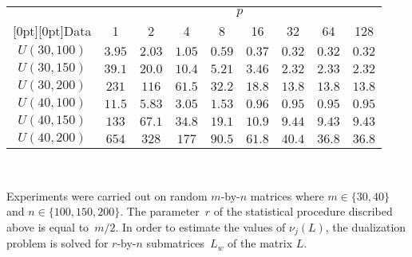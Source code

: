 \begin{multicols}{2}
\begin{table*}
\begin{center}
    \begin{tabular}{ccccccccc}
    \hline
    &\multicolumn{8}{c}{ $p$}\\
    \cline{2-9}
        \multicolumn{1}{c}{\raisebox{6pt}[0pt][0pt]{Data}}  & 1 & 2 & 4 & 8 & 16 & 32 & 64 & 128\\
               \hline
        $U(30,100)$ & $3.95$ & $2.03$ & $1.05$ & $0.59$ & $0.37$ & $0.32$ & $0.32$ &
        $0.32$ \\
        $U(30,150)$ & $39.1$\hphantom{99} & $20.0$\hphantom{99} & $10.4$\hphantom{99} &
        $5.21$ & $3.46$ & $2.32$ & $2.33$ &
        $2.32$ \\
        $U(30,200)$ & $231$\hphantom{9999.} & $116$\hphantom{9999.} & 
        $61.5$\hphantom{99} & 
        $32.2$\hphantom{99} & $18.8$\hphantom{99} & $13.8$\hphantom{99} & $13.8$\hphantom{99} &
        $13.8$\hphantom{99} \\
        $U(40,100)$ & $11.5$\hphantom{99} & $5.83$ & $3.05$ & $1.53$ & $0.96$ & $0.95$ & $0.95$ &
        $0.95$ \\
        $U(40,150)$ & $133$\hphantom{9999.} & $67.1$\hphantom{99} & $34.8$\hphantom{99} & 
        $19.1$\hphantom{99} & $10.9$\hphantom{99} & $9.44$ & $9.43$ &
        $9.43$ \\
        $U(40,200)$ & $654$\hphantom{9999.} & $328$\hphantom{9999.} & 
        $177$\hphantom{9999.} & 
        $90.5$\hphantom{99} & $61.8$\hphantom{99} & $40.4$\hphantom{99} & $36.8$\hphantom{99} &
        $36.8$\hphantom{99} \\
        \hline
    \end{tabular}
    \end{center}
\end{table*}

\begin{figure*} %
    \vspace*{1pt}
\begin{center}
\mbox{%
\epsfxsize=162.68mm
}
\end{center}
\vspace*{-9pt}
    \label{fig:s_scheme1}
\end{figure*}




Experiments were carried out on random $m$-by-$n$ matrices
where $m\in \{30,40\}$ and $n\in \{100,150,200\}$. The parameter~$r$ 
of the statistical procedure discribed above is equal to~$m/2$. 
In order to estimate the values of $\nu_j(L)$, the
dualization problem is solved for $r$-by-$n$ submatrices~$L_w$ of
the matrix $L$. 


\end{multicols}
